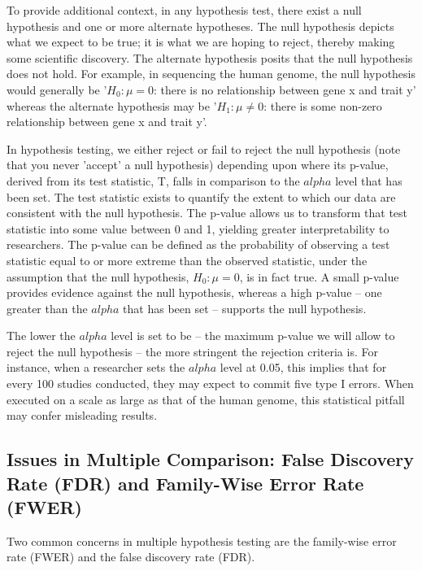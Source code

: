 \documentclass[12pt]{article}
\begin{document}
To provide additional context, in any hypothesis test, there exist a null hypothesis and one or more alternate hypotheses. The null hypothesis depicts what we expect to be true; it is what we are hoping to reject, thereby making some scientific discovery. The alternate hypothesis posits that the null hypothesis does not hold. For example, in sequencing the human genome, the null hypothesis would generally be '$H_0: \mu = 0$: there is no relationship between gene x and trait y' whereas the alternate hypothesis may be '$H_1: \mu \ne 0$: there is some non-zero relationship between gene x and trait y'. \par

In hypothesis testing, we either reject or fail to reject the null hypothesis (note that you never 'accept' a null hypothesis) depending upon where its p-value, derived from its test statistic, T, falls in comparison to the $alpha$ level that has been set. The test statistic exists to quantify the extent to which our data are consistent with the null hypothesis. The p-value allows us to transform that test statistic into some value between 0 and 1, yielding greater interpretability to researchers. The p-value can be defined as the probability of observing a test statistic equal to or more extreme than the observed statistic, under the assumption that the null hypothesis, $H_0: \mu = 0$, is in fact true. \cite{James2021} A small p-value provides evidence against the null hypothesis, whereas a high p-value -- one greater than the $alpha$ that has been set -- supports the null hypothesis. \par

The lower the $alpha$ level is set to be -- the maximum p-value we will allow to reject the null hypothesis -- the more stringent the rejection criteria is. For instance, when a researcher sets the $alpha$ level at 0.05, this implies that for every 100 studies conducted, they may expect to commit five type I errors. When executed on a scale as large as that of the human genome, this statistical pitfall may confer misleading results.

\subsection{Issues in Multiple Comparison: False Discovery Rate (FDR) and Family-Wise Error Rate (FWER)}
Two common concerns in multiple hypothesis testing are the family-wise error rate (FWER) and the false discovery rate (FDR). \par
\end{document}
